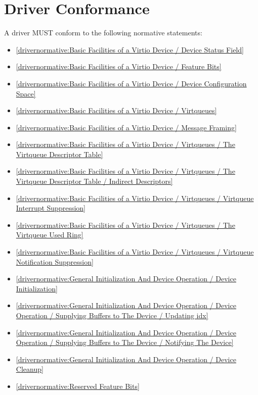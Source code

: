 \section{Driver Conformance}\label{sec:Conformance / Driver Conformance}

A driver MUST conform to the following normative statements:

\begin{itemize}
\item \ref{drivernormative:Basic Facilities of a Virtio Device / Device Status Field}
\item \ref{drivernormative:Basic Facilities of a Virtio Device / Feature Bits}
\item \ref{drivernormative:Basic Facilities of a Virtio Device / Device Configuration Space}
\item \ref{drivernormative:Basic Facilities of a Virtio Device / Virtqueues}
\item \ref{drivernormative:Basic Facilities of a Virtio Device / Message Framing}
\item \ref{drivernormative:Basic Facilities of a Virtio Device / Virtqueues / The Virtqueue Descriptor Table}
\item \ref{drivernormative:Basic Facilities of a Virtio Device / Virtqueues / The Virtqueue Descriptor Table / Indirect Descriptors}
\item \ref{drivernormative:Basic Facilities of a Virtio Device / Virtqueues / Virtqueue Interrupt Suppression}
\item \ref{drivernormative:Basic Facilities of a Virtio Device / Virtqueues / The Virtqueue Used Ring}
\item \ref{drivernormative:Basic Facilities of a Virtio Device / Virtqueues / Virtqueue Notification Suppression}
\item \ref{drivernormative:General Initialization And Device Operation / Device Initialization}
\item \ref{drivernormative:General Initialization And Device Operation / Device Operation / Supplying Buffers to The Device / Updating idx}
\item \ref{drivernormative:General Initialization And Device Operation / Device Operation / Supplying Buffers to The Device / Notifying The Device}
\item \ref{drivernormative:General Initialization And Device Operation / Device Cleanup}
\item \ref{drivernormative:Reserved Feature Bits}
\end{itemize}

